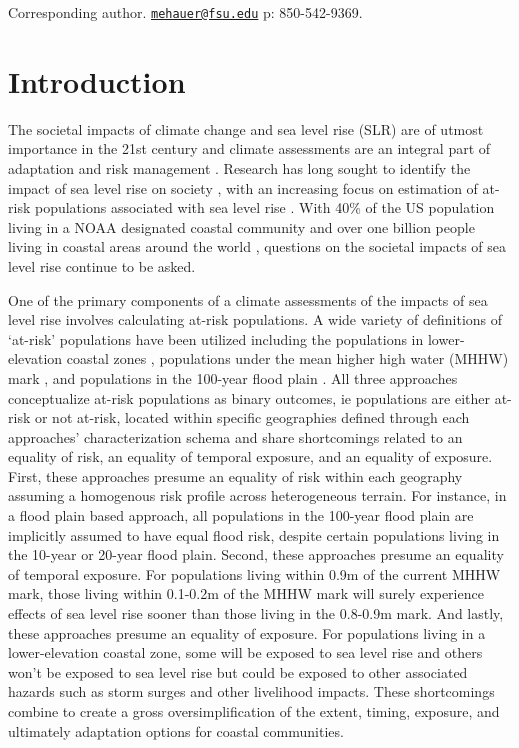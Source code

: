 \documentclass[12pt,]{article}
\begin{document}
\vskip 6.5pt


\noindent \doublespacing *Corresponding author.
\href{mailto:mehauer@fsu.edu}{\nolinkurl{mehauer@fsu.edu}} p:
850-542-9369.

\hypertarget{introduction}{%
\section{Introduction}\label{introduction}}

The societal impacts of climate change and sea level rise (SLR) are of
utmost importance in the 21st century and climate assessments are an
integral part of adaptation and risk management
\citep{howden2016innovations}. Research has long sought to identify the
impact of sea level rise on society
\citep{curtis2011understanding, wu2002vulnerability}, with an increasing
focus on estimation of at-risk populations associated with sea level
rise \citep{curtis2011understanding, strauss2015carbon}. With 40\% of
the US population living in a NOAA designated coastal community
\citep{ache2015coast} and over one billion people living in coastal
areas around the world \citep{neumann2015future}, questions on the
societal impacts of sea level rise continue to be asked.

One of the primary components of a climate assessments of the impacts of
sea level rise involves calculating at-risk populations. A wide variety
of definitions of `at-risk' populations have been utilized including the
populations in lower-elevation coastal zones
\citep{neumann2015future, mcgranahan2007rising}, populations under the
mean higher high water (MHHW) mark
\citep{hauer2016millions, strauss2015carbon}, and populations in the
100-year flood plain
\citep{nicholls2010sea, brown2018quantifying, hallegatte2011assessing, heberger2011potential}.
All three approaches conceptualize at-risk populations as binary
outcomes, ie populations are either at-risk or not at-risk, located
within specific geographies defined through each approaches'
characterization schema and share shortcomings related to an equality of
risk, an equality of temporal exposure, and an equality of exposure.
First, these approaches presume an equality of risk within each
geography assuming a homogenous risk profile across heterogeneous
terrain. For instance, in a flood plain based approach, all populations
in the 100-year flood plain are implicitly assumed to have equal flood
risk, despite certain populations living in the 10-year or 20-year flood
plain. Second, these approaches presume an equality of temporal
exposure. For populations living within 0.9m of the current MHHW mark,
those living within 0.1-0.2m of the MHHW mark will surely experience
effects of sea level rise sooner than those living in the 0.8-0.9m mark.
And lastly, these approaches presume an equality of exposure. For
populations living in a lower-elevation coastal zone, some will be
exposed to sea level rise and others won't be exposed to sea level rise
but could be exposed to other associated hazards such as storm surges
and other livelihood impacts. These shortcomings combine to create a
gross oversimplification of the extent, timing, exposure, and ultimately
adaptation options for coastal communities.
\end{document}
